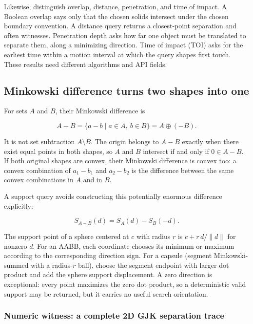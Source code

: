 Likewise, distinguish overlap, distance, penetration, and time of impact. A Boolean overlap says only that the chosen solids intersect under the chosen boundary convention. A distance query returns a closest-point separation and often witnesses. Penetration depth asks how far one object must be translated to separate them, along a minimizing direction. Time of impact (TOI) asks for the earliest time within a motion interval at which the query shapes first touch. These results need different algorithms and API fields.

\subsection{Minkowski difference turns two shapes into one}\label{03-visual-computing-i-ch020-minkowski-difference-turns-two-shapes-into-one}

\hypertarget{03-visual-computing-i-ch020-minkowski-difference-turns-two-shapes-into-one}{}

For sets \(A\) and \(B\), their Minkowski difference is

\[
A-B=\{a-b\mid a\in A,\ b\in B\}=A\oplus(-B).
\]

It is not set subtraction \(A\setminus B\). The origin belongs to \(A-B\) exactly when there exist equal points in both shapes, so \(A\) and \(B\) intersect if and only if \(0\in A-B\). If both original shapes are convex, their Minkowski difference is convex too: a convex combination of \(a_1-b_1\) and \(a_2-b_2\) is the difference between the same convex combinations in \(A\) and in \(B\).

A support query avoids constructing this potentially enormous difference explicitly:

\[
S_{A-B}(d)=S_A(d)-S_B(-d).
\]

The support point of a sphere centered at \(c\) with radius \(r\) is \(c+r\,d/\|d\|\) for nonzero \(d\). For an AABB, each coordinate chooses its minimum or maximum according to the corresponding direction sign. For a capsule (segment Minkowski-summed with a radius-\(r\) ball), choose the segment endpoint with larger dot product and add the sphere support displacement. A zero direction is exceptional: every point maximizes the zero dot product, so a deterministic valid support may be returned, but it carries no useful search orientation.

\subsubsection{Numeric witness: a complete 2D GJK separation trace}\label{03-visual-computing-i-ch020-numeric-witness-a-complete-2d-gjk-separation-trace}

